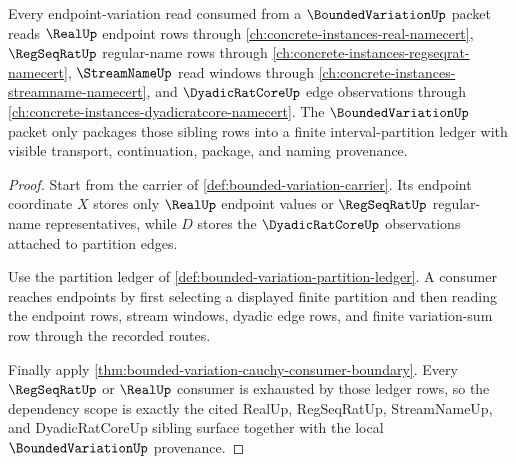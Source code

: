 \begin{theorem}
\label{thm:bounded-variation-real-dependency-scope}
Every endpoint-variation read consumed from a $\BoundedVariationUp$ packet reads $\RealUp$ endpoint rows through \autoref{ch:concrete-instances-real-namecert}, $\RegSeqRatUp$ regular-name rows through \autoref{ch:concrete-instances-regseqrat-namecert}, $\StreamNameUp$ read windows through \autoref{ch:concrete-instances-streamname-namecert}, and $\DyadicRatCoreUp$ edge observations through \autoref{ch:concrete-instances-dyadicratcore-namecert}. The $\BoundedVariationUp$ packet only packages those sibling rows into a finite interval-partition ledger with visible transport, continuation, package, and naming provenance.
\end{theorem}
\begin{proof}
Start from the carrier of \autoref{def:bounded-variation-carrier}. Its endpoint coordinate $X$ stores only $\RealUp$ endpoint values or $\RegSeqRatUp$ regular-name representatives, while $D$ stores the $\DyadicRatCoreUp$ observations attached to partition edges.

Use the partition ledger of \autoref{def:bounded-variation-partition-ledger}. A consumer reaches endpoints by first selecting a displayed finite partition and then reading the endpoint rows, stream windows, dyadic edge rows, and finite variation-sum row through the recorded routes.

Finally apply \autoref{thm:bounded-variation-cauchy-consumer-boundary}. Every $\RegSeqRatUp$ or $\RealUp$ consumer is exhausted by those ledger rows, so the dependency scope is exactly the cited RealUp, RegSeqRatUp, StreamNameUp, and DyadicRatCoreUp sibling surface together with the local $\BoundedVariationUp$ provenance.
\end{proof}

